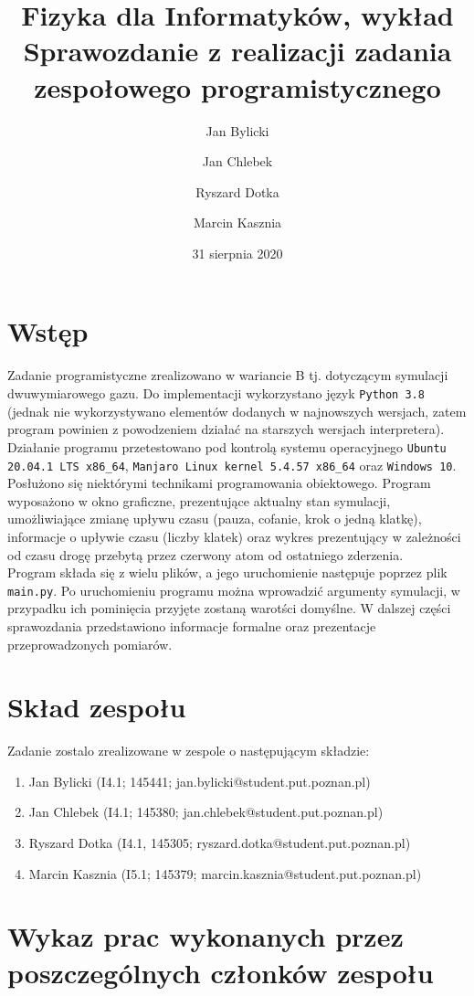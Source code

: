 \documentclass{article}
\title{Fizyka dla Informatyków, wykład\\ Sprawozdanie z realizacji zadania zespołowego programistycznego}
\author{Jan Bylicki \and Jan Chlebek \and Ryszard Dotka \and Marcin Kasznia}
\date{31 sierpnia 2020}
\begin{document}
\maketitle

\section{Wstęp}
Zadanie programistyczne zrealizowano w wariancie B tj. dotyczącym symulacji dwuwymiarowego gazu. Do implementacji wykorzystano język \verb+Python 3.8+ (jednak nie wykorzystywano elementów dodanych w najnowszych wersjach, zatem program powinien z powodzeniem działać na starszych wersjach interpretera). Działanie programu przetestowano pod kontrolą systemu operacyjnego \verb+Ubuntu 20.04.1 LTS x86_64+, \verb+Manjaro Linux kernel 5.4.57 x86_64+ oraz \verb+Windows 10+. Posłużono się niektórymi technikami programowania obiektowego. Program wyposażono w okno graficzne, prezentujące aktualny stan symulacji, umożliwiające zmianę upływu czasu (pauza, cofanie, krok o jedną klatkę), informacje o upływie czasu (liczby klatek) oraz wykres prezentujący w zależności od czasu drogę przebytą przez czerwony atom od ostatniego zderzenia.\\
Program składa się z wielu plików, a jego uruchomienie następuje poprzez plik \verb+main.py+. Po uruchomieniu programu można wprowadzić argumenty symulacji, w przypadku ich pominięcia przyjęte zostaną warotści domyślne.
W dalszej części sprawozdania przedstawiono informacje formalne oraz prezentacje przeprowadzonych pomiarów.

\section{Skład zespołu}
Zadanie zostalo zrealizowane w zespole o następującym składzie:
\begin{enumerate}
    \item Jan Bylicki (I4.1; 145441; jan.bylicki@student.put.poznan.pl)
    \item Jan Chlebek (I4.1; 145380; jan.chlebek@student.put.poznan.pl)
    \item Ryszard Dotka (I4.1, 145305; ryszard.dotka@student.put.poznan.pl)
    \item Marcin Kasznia (I5.1; 145379; marcin.kasznia@student.put.poznan.pl)
\end{enumerate}

\section{Wykaz prac wykonanych przez poszczególnych członków zespołu}
\end{document}
